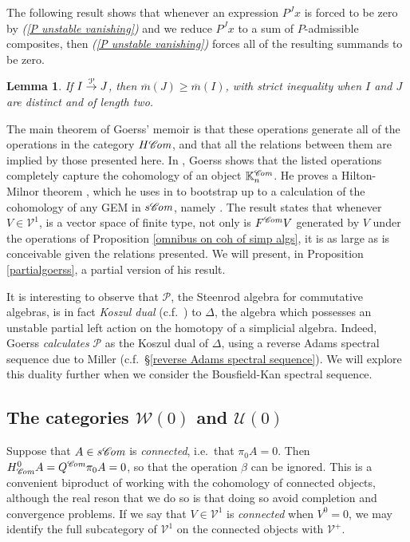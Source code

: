\documentclass[11pt]{amsart} \renewcommand{\baselinestretch}{1.2}
\theoremstyle{plain}
\newtheorem{lem}[thm]{Lemma}
\numberwithin{equation}{section} %
\theoremstyle{plain}
\newtheorem{lem}[thm]{Lemma}
\numberwithin{equation}{chapter} %
\newcommand{\scrC}{\mathscr{C}}
\newcommand{\calU}{\mathcal{U}}
\newcommand{\calP}{\mathcal{P}}
\newcommand{\calV}{\mathcal{V}}
\newcommand{\calw}{\mathcal{W}}
\newcommand{\citeBOX}[2][]{\cite[\mbox{#1}]{#2}}
\newcommand{\Palg}{{\calP}}
\newcommand{\deltaalg}{\Delta} %
\newcommand{\vect}[2]{\calV^{#1}_{#2}}
\newcommand{\HA}[1]{H#1}
\newcommand{\minDimP}{\overline{m}}
\newcommand{\produces}[3]{#3:#1\sim #2}
\renewcommand{\produces}[3]{#1\rightarrow_{#3} #2}%
\renewcommand{\produces}[3]{#1\overset{\smash{#3}}{\rightarrow} #2}%
\newcommand{\algs}{{\scrC\!\textit{\normalfont\textit{om}}}}
\newcommand{\SubsectionOrSection}[1]{\subsection{#1}}
\begin{document}
\begin{Constructing cohomology operations}
The following result shows that whenever an expression $P^Jx$ is forced to be zero by \emph{(\ref{P unstable vanishing})}  and we reduce $P^Jx$ to a sum of $P$-admissible composites, then \emph{(\ref{P unstable vanishing})} forces all of the resulting summands  to be zero.
\begin{lem}
\label{lemOnAdemChangeInMP}
If $\produces{I}{J}{\Palg}$, then $\minDimP(J) \geq \minDimP(I)$, with strict inequality when $I$ and $J$ are distinct and of length two.
\end{lem}
The main theorem of Goerss' memoir is that these operations generate all of the operations in the category $\HA{\algs}$, and that all  the relations between them  are implied by those presented here. In \cite[Chapter V]{MR1089001}, Goerss shows that the listed operations completely capture the cohomology of an object $\mathbb{K}_n^{\algs}$. He proves a Hilton-Milnor theorem \cite{GoerssHiltonMilnor.pdf}, which he uses in \citeBOX[\S11]{MR1089001} to bootstrap up to a calculation of the cohomology of any GEM in $s\algs$, namely \cite[Theorem I]{MR1089001}. The result states that whenever $V\in \vect{1}{}$,  is a  vector space of finite type, not only is 
$F^{\algs}V$
generated by $V$ under the operations of Proposition \ref{omnibus on coh of simp algs}, it is as large as is conceivable given the relations presented. We will present, in Proposition \ref{partialgoerss}, a partial version of his result.

It is  interesting to observe that $\Palg$, the Steenrod algebra for commutative algebras, is
in fact \emph{Koszul dual} (c.f.\ \cite{PriddyKoszul.pdf}) to $\deltaalg$, the algebra which possesses an unstable partial left action on the homotopy of a simplicial algebra. Indeed, Goerss \emph{calculates} $\Palg$ as the Koszul dual of $\deltaalg$, using a reverse Adams spectral sequence due to Miller \cite{MillerSullivanConjecture.pdf} (c.f.\ \S\ref{reverse Adams spectral sequence}). We will explore this duality further when we consider the Bousfield-Kan spectral sequence.

\SubsectionOrSection{The categories $\calw(0)$ and $\calU(0)$}
Suppose that $A\in s\algs$ is \emph{connected}, i.e.\ that $\pi_0A=0$. Then $H^0_{\algs}A=Q^{\algs}\pi_0A=0$, so that the operation $\beta$ can be ignored. This is a convenient biproduct of working with the cohomology of connected objects, although the real reson that we do so is that doing so avoid completion and convergence problems. If we say that $V\in \vect{1}{}$ is \emph{connected} when $V^{0}=0$, we may identify the full subcategory of $\vect{1}{}$ on the connected objects with $\vect{+}{}$.


\end{Constructing cohomology operations}
\end{document}
